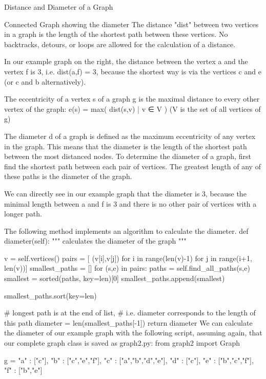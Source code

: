 Distance and Diameter of a Graph

Connected Graph showing the diameter The distance "dist" between two vertices in a graph is the length of the shortest path between these vertices. No backtracks, detours, or loops are allowed for the calculation of a distance. 

In our example graph on the right, the distance between the vertex a and the vertex f is 3, i.e. dist(a,f) = 3, because the shortest way is via the vertices c and e (or c and b alternatively). 

The eccentricity of a vertex s of a graph g is the maximal distance to every other vertex of the graph: 
e(s) = max( { dist(s,v) | v ∈ V }) 
(V is the set of all vertices of g) 

The diameter d of a graph is defined as the maximum eccentricity of any vertex in the graph. This means that the diameter is the length of the shortest path between the most distanced nodes. To determine the diameter of a graph, first find the shortest path between each pair of vertices. The greatest length of any of these paths is the diameter of the graph. 

We can directly see in our example graph that the diameter is 3, because the minimal length between a and f is 3 and there is no other pair of vertices with a longer path. 

The following method implements an algorithm to calculate the diameter.
    def diameter(self):
        """ calculates the diameter of the graph """
        
        v = self.vertices() 
        pairs = [ (v[i],v[j]) for i in range(len(v)-1) for j in range(i+1, len(v))]
        smallest_paths = []
        for (s,e) in pairs:
            paths = self.find_all_paths(s,e)
            smallest = sorted(paths, key=len)[0]
            smallest_paths.append(smallest)

        smallest_paths.sort(key=len)

        # longest path is at the end of list, 
        # i.e. diameter corresponds to the length of this path
        diameter = len(smallest_paths[-1])
        return diameter
We can calculate the diameter of our example graph with the following script, assuming again, that our complete graph class is saved as graph2.py:
from graph2 import Graph

g = { "a" : ["c"],
      "b" : ["c","e","f"],
      "c" : ["a","b","d","e"],
      "d" : ["c"],
      "e" : ["b","c","f"],
      "f" : ["b","e"]
}


